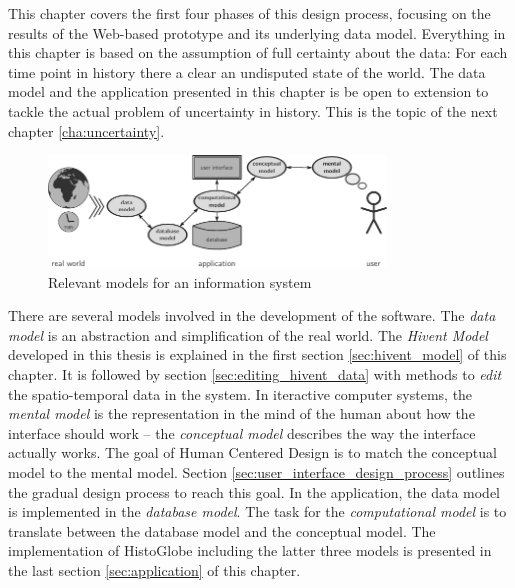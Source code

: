 This chapter covers the first four phases of this design process, focusing on the results of the Web-based prototype and its underlying data model. Everything in this chapter is based on the assumption of full certainty about the data: For each time point in history there a clear an undisputed state of the world. The data model and the application presented in this chapter is be open to extension to tackle the actual problem of uncertainty in history. This is the topic of the next chapter \ref{cha:uncertainty}.

\begin{figure}[H]
  \vspace{1.5em}
  \centering
  \includegraphics[width=0.8\textwidth]{graphics/development/models}
  \caption{Relevant models for an information system}
  \label{fig:models}
\end{figure}

There are several models involved in the development of the software. The \emph{data model} is an abstraction and simplification of the real world. The \emph{Hivent Model} developed in this thesis is explained in the first section \ref{sec:hivent_model} of this chapter. It is followed by section \ref{sec:editing_hivent_data} with methods to \emph{edit} the spatio-temporal data in the system. In iteractive computer systems, the \emph{mental model} is the representation in the mind of the human about how the interface should work -- the \emph{conceptual model} describes the way the interface actually works. The goal of Human Centered Design is to match the conceptual model to the mental model. Section \ref{sec:user_interface_design_process} outlines the gradual design process to reach this goal. In the application, the data model is implemented in the \emph{database model}. The task for the \emph{computational model} is to translate between the database model and the conceptual model. The implementation of HistoGlobe including the latter three models is presented in the last section \ref{sec:application} of this chapter.

\newpage





